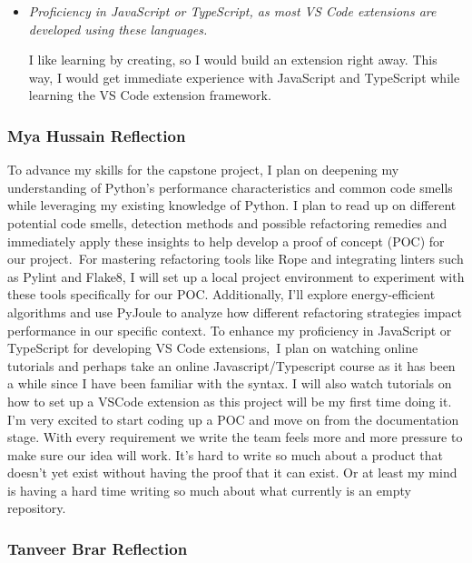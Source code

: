 \documentclass[12pt]{article}
\begin{document}
\begin{itemize}[label={}, wide=0pt, leftmargin=*]
  \item \textit{Proficiency in JavaScript or TypeScript, as most VS
    Code extensions are developed using these languages.}

    I like learning by creating, so I would build an extension right
    away. This way, I would get immediate experience with JavaScript
    and TypeScript while learning the VS Code extension framework.

\end{itemize}

\subsubsection*{Mya Hussain Reflection}
To advance my skills for the capstone project, I plan on deepening my
understanding of Python’s performance characteristics and common code
smells while leveraging my existing knowledge of Python. I plan to
read up on different potential code smells, detection methods and
possible refactoring remedies and immediately apply these insights to
help develop a proof of concept (POC) for our project. For mastering
refactoring tools like Rope and integrating linters such as Pylint
and Flake8, I will set up a local project environment to experiment
with these tools specifically for our POC. Additionally, I’ll explore
energy-efficient algorithms and use PyJoule to analyze how different
refactoring strategies impact performance in our specific context. To
enhance my proficiency in JavaScript or TypeScript for developing VS
Code extensions, I plan on watching online tutorials and perhaps take
an online Javascript/Typescript course as it has been a while since I
have been familiar with the syntax. I will also watch tutorials on
how to set up a VSCode extension as this project will be my first
time doing it. I'm very excited to start coding up a POC and move on
from the documentation stage. With every requirement we write the
team feels more and more pressure to make sure our idea will work.
It's hard to write so much about a product that doesn't yet exist
without having the proof that it can exist. Or at least my mind is
having a hard time writing so much about what currently is an empty repository.

\subsubsection*{Tanveer Brar Reflection}
\medskip
\end{document}
